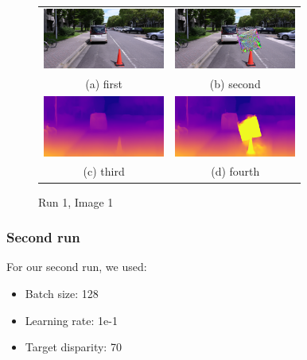 \documentclass[conference]{IEEEtran}
\begin{document}
\begin{figure}
  \begin{tabular}{cc}
    \includegraphics[width=40mm]{./images/results/img1/Dst_checkpoints_result_epoch_779_patch/img_original.png} &   \includegraphics[width=40mm]{./images/results/img1/Dst_checkpoints_result_epoch_779_patch/img_attacked.png} \\
  (a) first & (b) second \\[6pt]
   \includegraphics[width=40mm]{./images/results/img1/Dst_checkpoints_result_epoch_779_patch/disp_original.png} &   \includegraphics[width=40mm]{./images/results/img1/Dst_checkpoints_result_epoch_779_patch/disp_attacked.png} \\
  (c) third & (d) fourth \\[6pt]
  \end{tabular}
  \caption{Run 1, Image 1}
  \end{figure}

\subsubsection{Second run}
For our second run, we used:
\begin{itemize}
  \item Batch size: 128
  \item Learning rate: 1e-1
  \item Target disparity: 70
\end{itemize}
\end{document}
